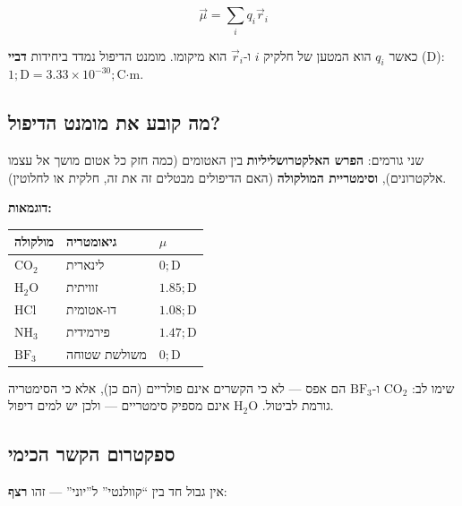 \documentclass[
  hebrew,
  letterpaper,
  DIV=11,
  numbers=noendperiod]{scrreprt}
\newcounter{none} %
\begin{document}
\[\vec{\mu} = \sum_i q_i \vec{r}_i\]

כאשר \(q_i\) הוא המטען של חלקיק \(i\) ו-\(\vec{r}_i\) הוא מיקומו. מומנט
הדיפול נמדד ביחידות \textbf{דביי} (D):
\(1;\text{D} = 3.33 \times 10^{-30};\text{C·m}\).

\subsection{מה קובע את מומנט
הדיפול?}\label{ux5deux5d4-ux5e7ux5d5ux5d1ux5e2-ux5d0ux5ea-ux5deux5d5ux5deux5e0ux5d8-ux5d4ux5d3ux5d9ux5e4ux5d5ux5dc}

שני גורמים: \textbf{הפרש האלקטרושליליות} בין האטומים (כמה חזק כל אטום
מושך אל עצמו אלקטרונים), \textbf{וסימטריית המולקולה} (האם הדיפולים
מבטלים זה את זה, חלקית או לחלוטין).

\textbf{דוגמאות:}

{\def\LTcaptype{none} %
\begin{longtable}[]{@{}lll@{}}
\toprule\noalign{}
מולקולה & גיאומטריה & \(\mu\) \\
\midrule\noalign{}
\endhead
\bottomrule\noalign{}
\endlastfoot
\(\text{CO}_2\) & לינארית & \(0;\text{D}\) \\
\(\text{H}_2\text{O}\) & זוויתית & \(1.85;\text{D}\) \\
\(\text{HCl}\) & דו-אטומית & \(1.08;\text{D}\) \\
\(\text{NH}_3\) & פירמידית & \(1.47;\text{D}\) \\
\(\text{BF}_3\) & משולשת שטוחה & \(0;\text{D}\) \\
\end{longtable}
}

שימו לב: \(\text{CO}_2\) ו-\(\text{BF}_3\) הם אפס --- לא כי הקשרים אינם
פולריים (הם כן), אלא כי הסימטריה גורמת לביטול. \(\text{H}_2\text{O}\)
אינם מספיק סימטריים --- ולכן יש למים דיפול.

\subsection{ספקטרום הקשר
הכימי}\label{ux5e1ux5e4ux5e7ux5d8ux5e8ux5d5ux5dd-ux5d4ux5e7ux5e9ux5e8-ux5d4ux5dbux5d9ux5deux5d9}

אין גבול חד בין ``קוולנטי'' ל''יוני'' --- זהו \textbf{רצף}:
\end{document}
